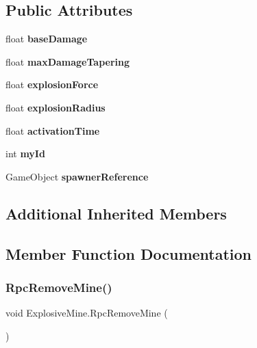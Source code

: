 \subsection*{Public Attributes}
\begin{DoxyCompactItemize}
\item 
\hypertarget{class_explosive_mine_a199b417f3b303812918df0961430348b}{}\label{class_explosive_mine_a199b417f3b303812918df0961430348b} 
float {\bfseries base\+Damage}
\item 
\hypertarget{class_explosive_mine_ab3ce0fd3d01399d877cc200e80e3f3e0}{}\label{class_explosive_mine_ab3ce0fd3d01399d877cc200e80e3f3e0} 
float {\bfseries max\+Damage\+Tapering}
\item 
\hypertarget{class_explosive_mine_ade7c1f852d8fcad364ddab03cf5bb248}{}\label{class_explosive_mine_ade7c1f852d8fcad364ddab03cf5bb248} 
float {\bfseries explosion\+Force}
\item 
\hypertarget{class_explosive_mine_a278c4e933dda33fb7183ef435f202dbe}{}\label{class_explosive_mine_a278c4e933dda33fb7183ef435f202dbe} 
float {\bfseries explosion\+Radius}
\item 
\hypertarget{class_explosive_mine_a01a06171b37140b9b73db0148a0553e3}{}\label{class_explosive_mine_a01a06171b37140b9b73db0148a0553e3} 
float {\bfseries activation\+Time}
\item 
\hypertarget{class_explosive_mine_a78587bac18b811896c58ef8c68415022}{}\label{class_explosive_mine_a78587bac18b811896c58ef8c68415022} 
int {\bfseries my\+Id}
\item 
\hypertarget{class_explosive_mine_a09a042e2e44f942da3d58040b31bacba}{}\label{class_explosive_mine_a09a042e2e44f942da3d58040b31bacba} 
Game\+Object {\bfseries spawner\+Reference}
\end{DoxyCompactItemize}
\subsection*{Additional Inherited Members}


\subsection{Member Function Documentation}
\hypertarget{class_explosive_mine_aed85961b63dd8298a1e9208f86b3b03c}{}\label{class_explosive_mine_aed85961b63dd8298a1e9208f86b3b03c} 
\subsubsection{\texorpdfstring{Rpc\+Remove\+Mine()}{RpcRemoveMine()}}
{\footnotesize\ttfamily void Explosive\+Mine.\+Rpc\+Remove\+Mine (\begin{DoxyParamCaption}{ }\end{DoxyParamCaption})}



